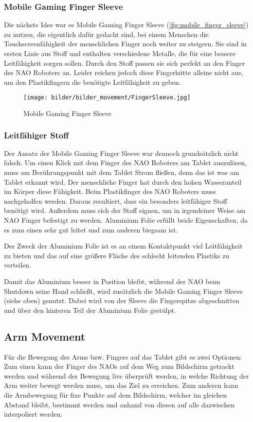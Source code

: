 \subsubsection{Mobile Gaming Finger Sleeve}
Die nächste Idee war es Mobile Gaming Finger Sleeve (\vref{fig:mobile_finger_sleeve}) zu nutzen, die eigentlich dafür gedacht sind, bei einem Menschen die Touchscreenfähigkeit der menschlichen Finger noch weiter zu steigern. Sie sind in ersten Linie aus Stoff und enthalten verschiedene Metalle, die für eine bessere Leitfähigkeit sorgen sollen. Durch den Stoff passen sie sich perfekt an den Finger des NAO Roboters an. Leider reichen jedoch diese Fingerhütte alleine nicht aus, um den Plastikfingern die benötigte Leitfähigkeit zu geben.
\begin{figure}[!htbp]
\centering
    \texttt{[image: bilder/bilder\_movement/FingerSleeve.jpg]}
        \caption{Mobile Gaming Finger Sleeve}
        \label{fig:mobile_finger_sleeve}
\end{figure}

\subsubsection{Leitfähiger Stoff}
Der Ansatz der Mobile Gaming Finger Sleeve war dennoch grundsätzlich nicht falsch. Um einen Klick mit dem Finger des NAO Roboters am Tablet auszulösen, muss am Berührungspunkt mit dem Tablet Strom fließen, denn das ist was am Tablet erkannt wird. Der menschliche Finger hat durch den hohen Wasseranteil im Körper diese Fähigkeit. Beim Plastikfinger des NAO Roboters muss nachgeholfen werden. 
Daraus resultiert, dass ein besonders leitfähiger Stoff benötigt wird. Außerdem muss sich der Stoff eignen, um in irgendeiner Weise am NAO Finger befestigt zu werden. Aluminium Folie erfüllt beide Eigenschaften, da es zum einen sehr gut leitet und zum anderen biegsam ist. 

Der Zweck der Aluminium Folie ist es an einem Kontaktpunkt viel Leitfähigkeit zu bieten und das auf eine größere Fläche des schlecht leitenden Plastiks zu verteilen.

Damit das Aluminium besser in Position bleibt, während der NAO beim Shutdown seine Hand schließt, wird zusätzlich die Mobile Gaming Finger Sleeve (siehe oben) genutzt. Dabei wird von der Sleeve die Fingerspitze abgeschnitten und über den hinteren Teil der Aluminium Folie gestülpt.

\subsection{Arm Movement}
Für die Bewegung des Arms bzw. Fingers auf das Tablet gibt es zwei Optionen:
Zum einen kann der Finger des NAOs auf dem Weg zum Bildschirm getrackt werden und während der Bewegung live überprüft werden, in welche Richtung der Arm weiter bewegt werden muss, um das Ziel zu erreichen.
Zum anderen kann die Armbewegung für fixe Punkte auf dem Bildschirm, welcher im gleichen Abstand bleibt, bestimmt werden und anhand von diesen auf alle dazwischen interpoliert werden. 

